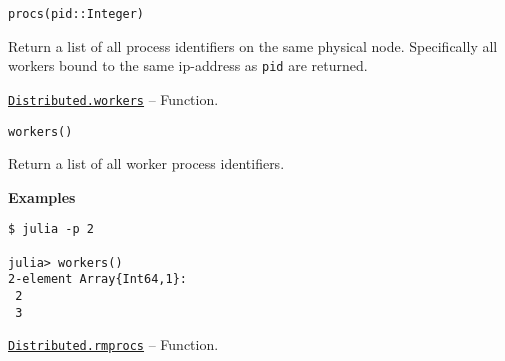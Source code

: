 \begin{adjustwidth}{2em}{0pt}


\begin{verbatim}
procs(pid::Integer)
\end{verbatim}

Return a list of all process identifiers on the same physical node. Specifically all workers bound to the same ip-address as \texttt{pid} are returned.



\end{adjustwidth}
\hypertarget{7474509137601932173}{}
\hyperlink{7474509137601932173}{\texttt{Distributed.workers}}  -- {Function.}

\begin{adjustwidth}{2em}{0pt}


\begin{verbatim}
workers()
\end{verbatim}

Return a list of all worker process identifiers.

\textbf{Examples}


\begin{verbatim}
$ julia -p 2

julia> workers()
2-element Array{Int64,1}:
 2
 3
\end{verbatim}



\end{adjustwidth}
\hypertarget{16165500032398890398}{}
\hyperlink{16165500032398890398}{\texttt{Distributed.rmprocs}}  -- {Function.}

